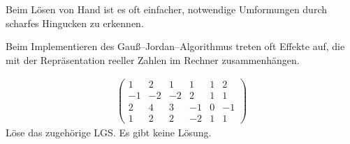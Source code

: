 Beim Lösen von Hand ist es oft einfacher, notwendige Umformungen durch \glqq{}scharfes Hingucken\grqq{} zu erkennen.

Beim Implementieren des Gauß--Jordan--Algorithmus treten oft Effekte auf, die mit der Repräsentation reeller Zahlen im Rechner zusammenhängen.

\begin{align*}
    \left(\begin{array}{ccccc|c}
        1 & 2 & 1 & 1 & 1 & 2 \\
        -1 & -2 & -2 & 2 & 1 & 1 \\
        2 & 4 & 3 & -1 & 0 & -1 \\
        1 & 2 & 2 & -2 & 1 & 1
    \end{array}\right)
\end{align*}
Löse das zugehörige LGS. Es gibt keine Lösung.
